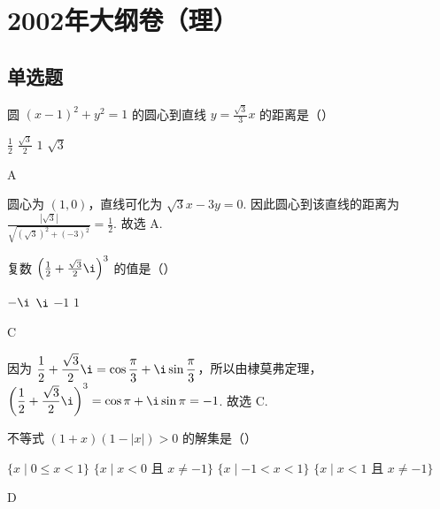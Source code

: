 \chapter{2002年大纲卷（理）}
\section{单选题}
\begin{problem}
圆 \(\left(x - 1\right)^2 + y^2 = 1\) 的圆心到直线 \(y = \frac{\sqrt{3}}{3} x\) 的距离是（\quad）

\choices
    {\( \frac{1}{2} \)}
    {\(\frac{\sqrt{3}}{2}\)}
    {\(1\)}
    {\(\sqrt{3}\)}
\end{problem}

\begin{answer}
A
\end{answer}

\begin{solution}
圆心为 \((1,0)\)，直线可化为 \(\sqrt{3}x-3y=0\). 因此圆心到该直线的距离为
\(\displaystyle\frac{|\sqrt{3}|}{\sqrt{(\sqrt{3})^2+(-3)^2}}=\frac{1}{2}\). 故选 A.
\end{solution}

\begin{problem}
复数 \(\left(\frac{1}{2} + \frac{\sqrt{3}}{2}\i\right)^3\) 的值是（\quad）

\choices
    {\(-\i\)}
    {\(\i\)}
    {\(-1\)}
    {\(1\)}
\end{problem}

\begin{answer}
C
\end{answer}

\begin{solution}
因为 \(\displaystyle\frac{1}{2}+\frac{\sqrt{3}}{2}\i=\cos\frac{\pi}{3}+\i\sin\frac{\pi}{3}\)，所以由棣莫弗定理，
\(\displaystyle\left(\frac{1}{2}+\frac{\sqrt{3}}{2}\i\right)^3=\cos\pi+\i\sin\pi=-1\). 故选 C.
\end{solution}

\begin{problem}
不等式 \(\left(1 + x\right)\left(1 - |x|\right) > 0\) 的解集是（\quad）

\choices
    {\(\{x\mid 0\leqslant x < 1\}\)}
    {\(\{x\mid x < 0 \text{ 且 } x\neq -1\}\)}
    {\(\{x\mid -1 < x < 1\}\)}
    {\(\{x\mid x < 1 \text{ 且 } x\neq -1\}\)}
\end{problem}

\begin{answer}
D
\end{answer}

